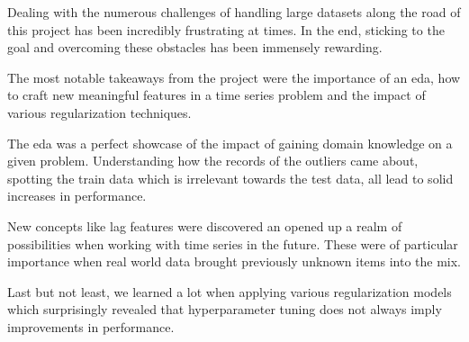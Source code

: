 Dealing with the numerous challenges of handling large datasets along the road of this project has been incredibly frustrating at times. In the end, sticking to the goal and overcoming these obstacles has been immensely rewarding.

The most notable takeaways from the project were the importance of an \acrshort{eda}, how to craft new meaningful features in a time series problem and the impact of various regularization techniques.

The \acrshort{eda} was a perfect showcase of the impact of gaining domain knowledge on a given problem. Understanding how the records of the outliers came about, spotting the train data which is irrelevant towards the test data, all
 lead to solid increases in performance.

New concepts like lag features were discovered an opened up a realm of possibilities when working with time series in the future. These were of particular importance when real world data brought previously unknown items into the mix.

Last but not least, we learned a lot when applying various regularization models which surprisingly revealed that \gls{hyperparameter} tuning does not always imply improvements in performance.
